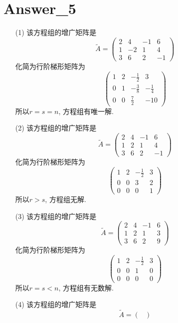 \documentclass{article}
\begin{document}
\section{Answer\_5}

\begin{itemize}
    \item[(1)]
    该方程组的增广矩阵是
    $$\tilde{A} = \begin{pmatrix}
        2 & 4 & -1 & 6 \\
        1 & -2 & 1 & 4 \\
        3 & 6 & 2 & -1
        \end{pmatrix}$$
    化简为行阶梯形矩阵为
    $$\begin{pmatrix}
        1 & 2 & -\frac{1}{2} & 3 \\
        0 & 1 & -\frac{3}{8} & -\frac{1}{4} \\
        0 & 0 & \frac{7}{2} & -10
        \end{pmatrix}$$
    所以$r = s = n$, 方程组有唯一解.
    \item[(2)]
    该方程组的增广矩阵是
    $$\tilde{A} = \begin{pmatrix}
        2 & 4 & -1 & 6 \\
        1 & 2 & 1 & 4 \\
        3 & 6 & 2 & -1
        \end{pmatrix}$$
    化简为行阶梯形矩阵为
    $$\begin{pmatrix}
        1 & 2 & -\frac{1}{2} & 3 \\
        0 & 0 & 3 & 2 \\
        0 & 0 & 0 & 1
        \end{pmatrix}
        $$
    所以$r > s$, 方程组无解.
    \item[(3)]
    该方程组的增广矩阵是
    $$\tilde{A} = \begin{pmatrix}
        2 & 4 & -1 & 6 \\
        1 & 2 & 1 & 3 \\
        3 & 6 & 2 & 9
        \end{pmatrix}
        $$
    化简为行阶梯形矩阵为
    $$\begin{pmatrix}
        1 & 2 & -\frac{1}{2} & 3 \\
        0 & 0 & 1 & 0 \\
        0 & 0 & 0 & 0
        \end{pmatrix}
        $$
    所以$r = s < n$, 方程组有无数解.
    \item[(4)]
    该方程组的增广矩阵是
    $$\tilde{A} = \begin{pmatrix}

\end{pmatrix}$$
\end{itemize}
\end{document}
